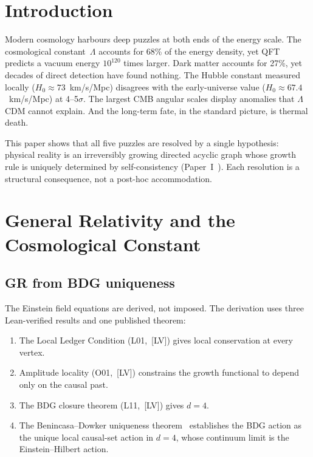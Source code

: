 \documentclass[11pt,a4paper]{article}
\theoremstyle{plain}
\theoremstyle{definition}
\theoremstyle{remark}
\begin{document}
\section{Introduction}\label{sec:intro}

Modern cosmology harbours deep puzzles at both ends of the energy scale.  The
cosmological constant~$\Lambda$ accounts for 68\% of the energy density, yet QFT
predicts a vacuum energy $10^{120}$ times larger.  Dark matter accounts for 27\%,
yet decades of direct detection have found nothing.  The Hubble constant measured
locally ($H_0 \approx 73$~km/s/Mpc) disagrees with the early-universe value
($H_0 \approx 67.4$~km/s/Mpc) at 4--5$\sigma$.  The largest CMB angular scales
display anomalies that $\Lambda$CDM cannot explain.  And the long-term fate, in the
standard picture, is thermal death.

This paper shows that all five puzzles are resolved by a single hypothesis: physical
reality is an irreversibly growing directed acyclic graph whose growth rule is
uniquely determined by self-consistency (Paper~I~\cite{P1}).  Each resolution is a
structural consequence, not a post-hoc accommodation.

\section{General Relativity and the Cosmological Constant}\label{sec:gr}

\subsection{GR from BDG uniqueness}\label{sec:gr-deriv}

The Einstein field equations are derived, not imposed.  The derivation uses three
Lean-verified results and one published theorem:

\begin{enumerate}[nosep]
\item The Local Ledger Condition (L01,~[LV]) gives local conservation at every
  vertex.
\item Amplitude locality (O01,~[LV]) constrains the growth functional to depend
  only on the causal past.
\item The BDG closure theorem (L11,~[LV]) gives $d = 4$.
\item The Benincasa--Dowker uniqueness theorem~\cite{BenincasaDowker2010}
  establishes the BDG action as the unique local causal-set action in $d = 4$,
  whose continuum limit is the Einstein--Hilbert action.
\end{enumerate}
\end{document}

